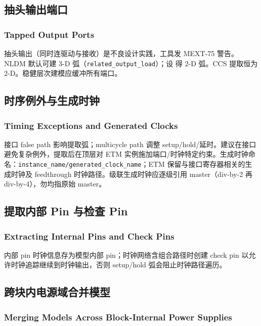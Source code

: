 \subsection{抽头输出端口}
\subsubsection*{Tapped Output Ports}

抽头输出（同时连驱动与接收）是不良设计实践，工具发 MEXT-75 警告。NLDM 默认可建 3-D 弧（\texttt{related\_output\_load}）；设  得 2-D 弧。CCS 提取恒为 2-D。稳健层次建模应缓冲所有端口。

\subsection{时序例外与生成时钟}
\subsubsection*{Timing Exceptions and Generated Clocks}

接口 false path 影响提取弧；multicycle path 调整 setup/hold/延时。建议在接口避免复杂例外，提取后在顶层对 ETM 实例施加端口/时钟特定约束。生成时钟命名：\texttt{instance\_name/generated\_clock\_name}；ETM 保留与接口寄存器相关的生成时钟及 feedthrough 时钟路径。级联生成时钟应逐级引用 master（div-by-2 再 div-by-4），勿均指原始 master。

\subsection{提取内部 Pin 与检查 Pin}
\subsubsection*{Extracting Internal Pins and Check Pins}

内部 pin 时钟信息存为模型内部 pin；时钟网络含组合路径时创建 check pin 以允许时钟追踪继续到时钟输出，否则 setup/hold 弧会阻止时钟路径遍历。

\subsection{跨块内电源域合并模型}
\subsubsection*{Merging Models Across Block-Internal Power Supplies}

